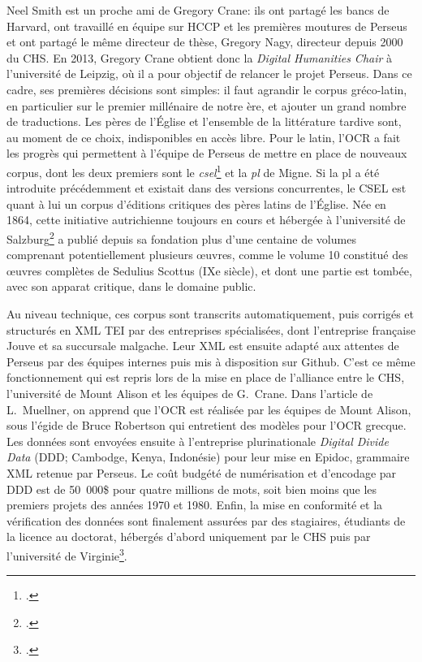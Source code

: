 Neel Smith est un proche ami de Gregory Crane: ils ont partagé les bancs de Harvard, ont travaillé en équipe sur HCCP et les premières moutures de Perseus et ont partagé le même directeur de thèse, Gregory Nagy, directeur depuis 2000 du CHS. En 2013, Gregory Crane obtient donc la \textit{Digital Humanities Chair} à l'université de Leipzig, où il a pour objectif de relancer le projet Perseus. Dans ce cadre, ses premières décisions sont simples: il faut agrandir le corpus gréco-latin, en particulier sur le premier millénaire de notre ère, et ajouter un grand nombre de traductions. Les pères de l'Église et l'ensemble de la littérature tardive sont, au moment de ce choix, indisponibles en accès libre. Pour le latin, l'OCR a fait les progrès qui permettent à l'équipe de Perseus de mettre en place de nouveaux corpus, dont les deux premiers sont le \textit{\acrfull{csel}}\footcite{noauthor_csel_nodate} et la \textit{\acrfull{pl}} de Migne. Si la \acrshort{pl} a été introduite précédemment et existait dans des versions concurrentes, le CSEL est quant à lui un corpus d'éditions critiques des pères latins de l'Église. Née en 1864, cette initiative autrichienne toujours en cours et hébergée à l'université de Salzburg\footcite{noauthor_history_nodate} a publié depuis sa fondation plus d'une centaine de volumes comprenant potentiellement plusieurs œuvres, comme le volume 10 constitué des œuvres complètes de Sedulius Scottus (IXe siècle), et dont une partie est tombée, avec son apparat critique, dans le domaine public.

Au niveau technique, ces corpus sont transcrits automatiquement, puis corrigés et structurés en XML TEI par des entreprises spécialisées, dont l'entreprise française Jouve et sa succursale malgache. Leur XML est ensuite adapté aux attentes de Perseus par des équipes internes puis mis à disposition sur Github. C'est ce même fonctionnement qui est repris lors de la mise en place de l'alliance entre le CHS, l'université de Mount Alison et les équipes de G.~Crane. Dans l'article de L.~Muellner, on apprend que l'OCR est réalisée par les équipes de Mount Alison, sous l'égide de Bruce Robertson qui entretient des modèles pour l'OCR grecque. Les données sont envoyées ensuite à l'entreprise plurinationale \textit{Digital Divide Data} (DDD; Cambodge, Kenya, Indonésie) pour leur mise en Epidoc, grammaire XML retenue par Perseus. Le coût budgété de numérisation et d'encodage par DDD est de 50~000\$ pour quatre millions de mots, soit bien moins que les premiers projets des années 1970 et 1980. Enfin, la mise en conformité et la vérification des données sont finalement assurées par des stagiaires, étudiants de la licence au doctorat, hébergés d'abord uniquement par le CHS puis par l'université de Virginie\footcite{robertson2019optical}.

